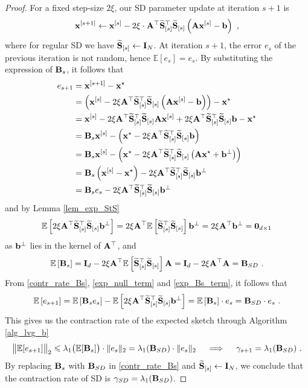 \documentclass[journal,letterpaper,onecolumn,twoside,nofonttune]{IEEEtran}
\newcommand{\E}{\mathbb{E}}
\newcommand{\bb}{\bold{b}}
\newcommand{\xb}{\bold{x}}
\newcommand{\Ab}{\bold{A}}
\newcommand{\Bb}{\bold{B}}
\newcommand{\Ib}{\bold{I}}
\newcommand{\Sb}{\bold{S}}
\newcommand{\Sbwt}{\widetilde{\Sb}}
\begin{document}
\begin{proof}
For a fixed step-size $2\xi$, our SD parameter update at iteration $s+1$ is
$$ \xb^{[s+1]}\gets\xb^{[s]}-2\xi\cdot\Ab^\top\Sbwt_{[s]}^\top\Sbwt_{[s]}\left(\Ab\xb^{[s]}-\bb\right)\ , $$
where for regular SD we have $\Sbwt_{[s]}\gets\Ib_N$. At iteration $s+1$, the error $e_s$ of the previous iteration is not random, hence $\E[e_s]=e_s$. By substituting the expression of $\Bb_s$, it follows that%
\begin{align}
  e_{s+1} &= \xb^{[s+1]}-\xb^\star \notag\\
  &= \left(\xb^{[s]}-2\xi\Ab^\top\Sbwt_{[s]}^\top\Sbwt_{[s]}\left(\Ab\xb^{[s]}-\bb\right)\right)-\xb^\star \notag\\
  &= \xb^{[s]}-2\xi\Ab^\top\Sbwt_{[s]}^\top\Sbwt_{[s]}\Ab\xb^{[s]}+2\xi\Ab^\top\Sbwt_{[s]}^\top\Sbwt_{[s]}\bb-\xb^\star \notag\\
  &= \Bb_s\xb^{[s]}-\left(\xb^\star-2\xi\Ab^\top\Sbwt_{[s]}^\top\Sbwt_{[s]}\bb\right) \notag\\
  &= \Bb_s\xb^{[s]}-\left(\xb^\star-2\xi\Ab^\top\Sbwt_{[s]}^\top\Sbwt_{[s]}\left(\Ab\xb^\star+\bb^\perp\right)\right) \notag\\
  &= \Bb_s\left(\xb^{[s]}-\xb^\star\right) - 2\xi\Ab^\top\Sbwt_{[s]}^\top\Sbwt_{[s]}\bb^\perp \notag\\
  &= \Bb_s e_s - 2\xi\Ab^\top\Sbwt_{[s]}^\top\Sbwt_{[s]}\bb^\perp \label{contr_rate_Bs}
\end{align}
and by Lemma \ref{lem_exp_StS}%
\begin{equation}
\label{exp_null_term}
  \E\left[2\xi\Ab^\top\Sbwt_{[s]}^\top\Sbwt_{[s]}\bb^\perp\right] = 2\xi\Ab^\top\E\left[\Sbwt_{[s]}^\top\Sbwt_{[s]}\right]\bb^\perp = 2\xi\Ab^\top\bb^\perp = \bold{0}_{d\times 1}
\end{equation}
as $\bb^\perp$ lies in the kernel of $\Ab^\top$, and
\begin{equation}
\label{exp_Bs_term}
  \E\left[\Bb_s\right] = \Ib_d-2\xi\Ab^\top\E\left[\Sbwt_{[s]}^\top\Sbwt_{[s]}\right]\Ab = \Ib_d-2\xi\Ab^\top\Ab = \Bb_{SD}\ .
\end{equation}
From \eqref{contr_rate_Bs}, \eqref{exp_null_term} and \eqref{exp_Bs_term}, it follows that
\begin{equation}
  \E\left[e_{s+1}\right] = \E\left[\Bb_s e_s\right] - \E\left[2\xi\Ab^\top\Sbwt_{[s]}^\top\Sbwt_{[s]}\bb^\perp\right] = \E\left[\Bb_s \right] \cdot e_s = \Bb_{SD}\cdot e_s \ .
\end{equation}
This gives us the contraction rate of the expected sketch through Algorithm \ref{alg_lvg_b}
\begin{equation}
  \big\|\E[e_{s+1}]\big\|_2 \leqslant \lambda_1\big(\E[\Bb_s]\big)\cdot\|e_{s}\|_2 = \lambda_1(\Bb_{SD})\cdot\|e_{s}\|_2 \quad \implies \quad \gamma_{s+1}=\lambda_1(\Bb_{SD})\ .
\end{equation}
By replacing $\Bb_s$ with $\Bb_{SD}$ in \eqref{contr_rate_Bs} and $\Sbwt_{[s]}\gets\Ib_N$, we conclude that the contraction rate of SD is $\gamma_{SD}=\lambda_1(\Bb_{SD})$.
\end{proof}
\end{document}
